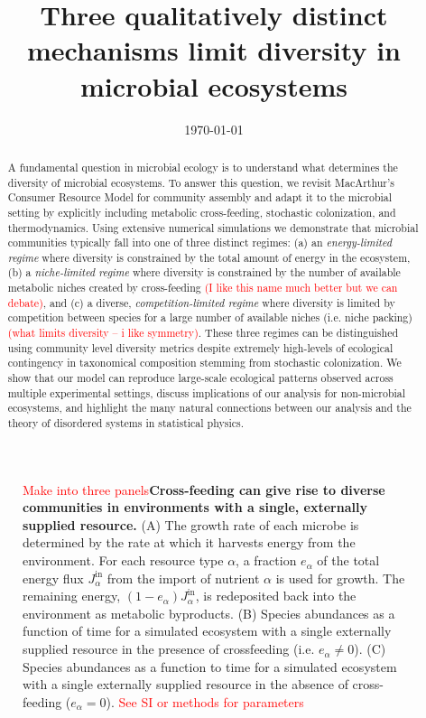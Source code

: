 \documentclass[aps,amsmath,graphix,amssymb,longbibliography]{revtex4-1}
\newcommand\0{\scalebox{-1}[1]{0}}
\newcommand*{\red}{\textcolor{red}}
\begin{document}
\title{Three qualitatively distinct mechanisms  limit diversity in microbial ecosystems }


\date{\today{}}

\begin{abstract}
A fundamental question  in microbial ecology is to understand what determines the diversity of microbial ecosystems. To answer this question, we revisit MacArthur's Consumer Resource Model for community assembly and adapt it to the microbial setting by explicitly including metabolic cross-feeding, stochastic colonization, and thermodynamics.  Using extensive numerical simulations we demonstrate that microbial communities typically fall into one of three  distinct regimes: (a) an \emph{energy-limited regime} where diversity is constrained by the total amount of energy in the ecosystem, (b) a \emph{niche-limited regime} where diversity is constrained by the number of available metabolic niches created by cross-feeding  \red{(I like this name much better but we can debate)}, and (c) a diverse, \emph{competition-limited regime} where diversity is limited by competition between species for a large number of available niches (i.e. niche packing)  \red{(what limits diversity -- i like symmetry)}. These three regimes can be distinguished using community level diversity metrics despite extremely high-levels of ecological contingency in taxonomical composition stemming from stochastic colonization. We show that our model can reproduce large-scale ecological patterns observed across multiple experimental settings, discuss implications of our analysis for non-microbial ecosystems, and highlight the many natural connections between our analysis and the theory of disordered systems in statistical physics.
\end{abstract}




\maketitle

\begin{figure}
\caption{ \red{ Make into three panels}{\bf Cross-feeding can give rise to diverse communities in environments with a single, externally supplied resource.} (A) The growth rate of each microbe is determined by the rate at which it harvests energy from the environment. For each resource type $\alpha$, a fraction $e_\alpha$ of the total energy flux $J_\alpha^\mathrm{in}$ from the import of nutrient $\alpha$ is used for growth. The remaining energy, $(1-e_\alpha) J_\alpha^\mathrm{in}$, is redeposited back into the environment as metabolic byproducts. (B) Species abundances as a function of time for a simulated ecosystem with a single externally supplied resource in the presence of crossfeeding (i.e. $e_\alpha \neq 0$). (C) Species abundances as a function to time for a simulated ecosystem with a single externally supplied resource in the absence of cross-feeding ($e_\alpha =0$).  \red{See SI or methods for parameters} }
\end{figure}
\end{document}
